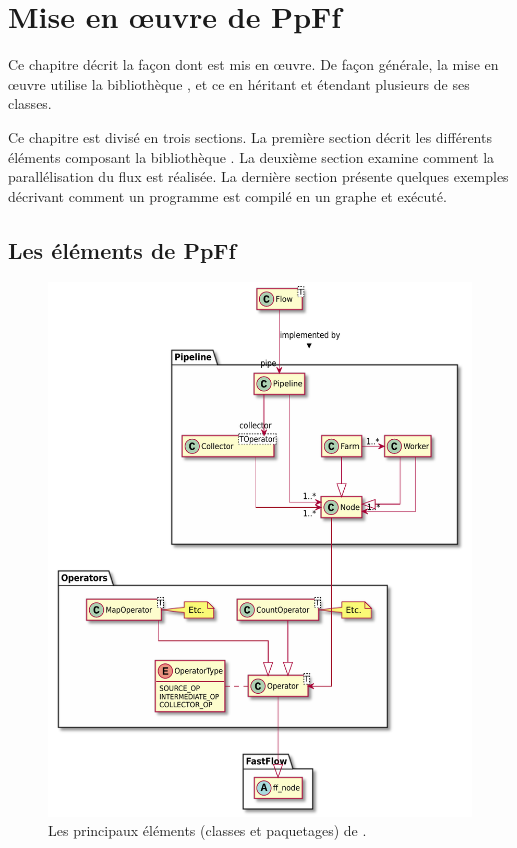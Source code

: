 
\chapter{Mise en \oe{}uvre de PpFf}
\label{implementation.chap}


Ce chapitre décrit la fa\c{c}on dont  est mis en \oe{}uvre.
%
De fa\c{c}on g\'en\'erale, la mise en \oe{}uvre utilise la biblioth\`eque , et ce en h\'eritant et \'etendant plusieurs de ses classes.

Ce chapitre est divis\'e en trois sections.
%
La premi\`ere section d\'ecrit les diff\'erents éléments composant la biblioth\`eque . La deuxi\`eme section examine comment la parall\'elisation du flux est r\'ealis\'ee. La derni\`ere section pr\'esente quelques exemples d\'ecrivant comment un programme \PpFf{} est compil\'e en un graphe  et ex\'ecut\'e.


\section{Les \'el\'ements de {PpFf}}

\begin{figure}
\centering
         \includegraphics[width=1.0\textwidth]{Figures/vueEnsemble.pdf}
      \caption{Les principaux éléments (classes et paquetages) de .}
       \label{All.fig}
\end{figure}

